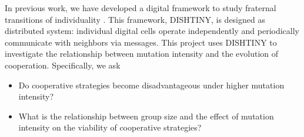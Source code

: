 In previous work, we have developed a digital framework to study fraternal transitions of individuality \cite{moreno2018toward}.
This framework, DISHTINY, is designed as distributed system: individual digital cells operate independently and periodically communicate with neighbors via messages.
This project uses DISHTINY to investigate the relationship between mutation intensity and the evolution of cooperation.
Specifically, we ask
\begin{itemize}
\item Do cooperative strategies become disadvantageous under higher mutation intensity?
\item What is the relationship between group size and the effect of mutation intensity on the viability of cooperative strategies?
\end{itemize}

